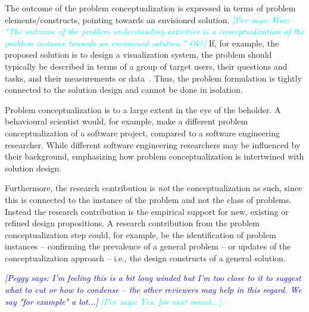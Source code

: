 \documentclass[graybox]{svmult}
\newcommand{\peggy}[1]{\textcolor{blue}{{\it [Peggy says: #1]}}}
\newcommand{\per}[1]{\textcolor{cyan}{{\it [Per says: #1]}}}
\newcommand{\peggy}[1]{}
\newcommand{\per}[1]{}
\begin{document}
The outcome of the problem conceptualization is expressed in terms of problem elements/constructs, pointing towards an envisioned solution. \per{Was: "The outcome of the problem understanding activities is a conceptualization of the problem instance towards an envisioned solution." Ok?} If, for example, the proposed solution is to design a visualization system, the problem should typically be described in terms of a group of target users, their questions and tasks, and their measurements or data~\cite{meyer_nested_2015}. Thus, the problem formulation is tightly connected to the solution design and cannot be done in isolation. 

Problem conceptualization is to a large extent in the eye of the beholder. A behavioural scientist would, for example,  make a different problem conceptualization of a software project, compared to a software engineering researcher. While different software engineering researchers may be influenced by their background, emphasizing how problem conceptualization is intertwined with solution design.



Furthermore, the research contribution is \emph{not} the conceptualization as such, since this is connected to the instance of the problem and not the class of problems. Instead the research contribution is the empirical support for new, existing or refined design propositions. A research contribution from the problem conceptualization step could, for example, be the identification of problem instances -- confirming the prevalence of a general problem -- or updates of the conceptualization approach -- i.e., the design constructs of a general solution.

\peggy{I'm feeling this is a bit long winded but I'm too close to it to suggest what to cut or how to condense -- the other reviewers may help in this regard.  We say "for example" a lot...} \per{Yes, for next round...}

\end{document}
